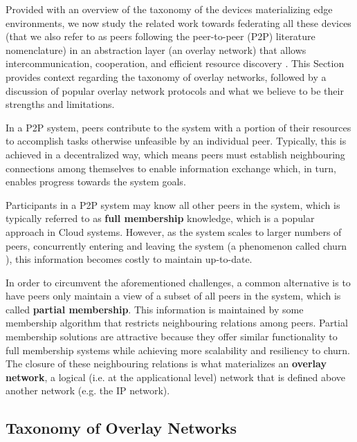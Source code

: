 



Provided with an overview of the taxonomy of the devices materializing edge environments, we now study the related work towards federating all these devices (that we also refer to as peers following the peer-to-peer (P2P) literature nomenclature) in an abstraction layer (an overlay network) that allows intercommunication, cooperation, and efficient resource discovery \cite{leitaoPHDthesis}. This Section provides context regarding the taxonomy of overlay networks, followed by a discussion of popular overlay network protocols and what we believe to be their strengths and limitations.

In a P2P system, peers contribute to the system with a portion of their resources to accomplish tasks otherwise unfeasible by an individual peer. Typically, this is achieved in a decentralized way, which means peers must establish neighbouring connections among themselves to enable information exchange which, in turn, enables progress towards the system goals. 

Participants in a P2P system may know all other peers in the system, which is typically referred to as \textbf{full membership} knowledge, which is a popular approach in Cloud systems. However, as the system scales to larger numbers of peers, concurrently entering and leaving the system (a phenomenon called churn \cite{stutzbach2006understanding}), this information becomes costly to maintain up-to-date. 

In order to circumvent the aforementioned challenges, a common alternative is to have peers only maintain a view of a subset of all peers in the system, which is called \textbf{partial membership}. This information is maintained by some membership algorithm that restricts neighbouring relations among peers. Partial membership solutions are attractive because they offer similar functionality to full membership systems while achieving more scalability and resiliency to churn. The closure of these neighbouring relations is what materializes an \textbf{overlay network}, a logical (i.e. at the applicational level) network that is defined above another network (e.g. the IP network).

\subsection{Taxonomy of Overlay Networks}

